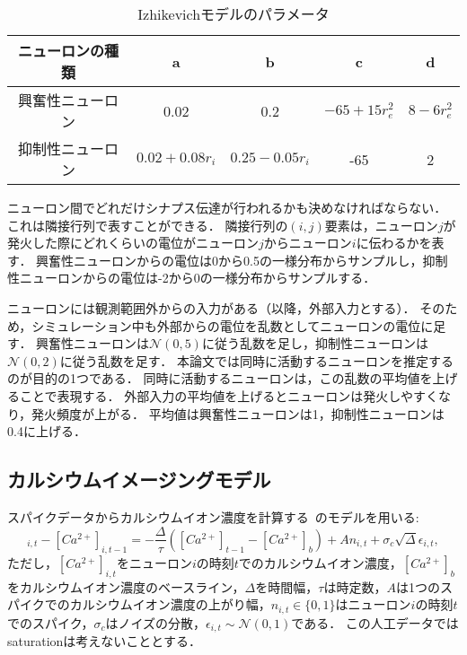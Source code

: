 \begin{table}[htb]
  \center
  \begin{tabular}{|c|cccc|} \hline
    ニューロンの種類 & a & b & c & d \\ \hline
    興奮性ニューロン & 0.02 & 0.2 & $-65 + 15 r_e^2$ & $8 - 6r_e^2$ \\
    抑制性ニューロン & $0.02 + 0.08r_i$ & $0.25 - 0.05 r_i$ & -65 & 2 \\ \hline
  \end{tabular}
  \caption{Izhikevichモデルのパラメータ}
  \label{tab:parameter1}
\end{table}

ニューロン間でどれだけシナプス伝達が行われるかも決めなければならない．
これは隣接行列で表すことができる．
隣接行列の$(i,j)$要素は，ニューロン$j$が発火した際にどれくらいの電位がニューロン$j$からニューロン$i$に伝わるかを表す．
興奮性ニューロンからの電位は0から0.5の一様分布からサンプルし，抑制性ニューロンからの電位は-2から0の一様分布からサンプルする．

ニューロンには観測範囲外からの入力がある（以降，外部入力とする）．
そのため，シミュレーション中も外部からの電位を乱数としてニューロンの電位に足す．
興奮性ニューロンは$\mathcal{N}(0,5)$に従う乱数を足し，抑制性ニューロンは$\mathcal{N}(0,2)$に従う乱数を足す．
本論文では同時に活動するニューロンを推定するのが目的の1つである．
同時に活動するニューロンは，この乱数の平均値を上げることで表現する．
外部入力の平均値を上げるとニューロンは発火しやすくなり，発火頻度が上がる．
平均値は興奮性ニューロンは1，抑制性ニューロンは0.4に上げる．

\subsection{カルシウムイメージングモデル}
スパイクデータからカルシウムイオン濃度を計算する~\cite{Vogelstein2009}のモデルを用いる:
\begin{equation}
  [Ca^{2+}]_{i,t} - [Ca^{2+}]_{i,t-1} = - \frac{\Delta}{\tau}([Ca^{2+}]_{t-1} - [Ca^{2+}]_b) + An_{i,t} + \sigma_c \sqrt{\Delta} \epsilon_{i,t},
  \label{eq:calcium}
\end{equation}
ただし，$[Ca^{2+}]_{i,t}$をニューロン$i$の時刻$t$でのカルシウムイオン濃度，$[Ca^{2+}]_b$をカルシウムイオン濃度のベースライン，$\Delta$を時間幅，$\tau$は時定数，$A$は1つのスパイクでのカルシウムイオン濃度の上がり幅，$n_{i,t} \in \{0,1\}$はニューロン$i$の時刻$t$でのスパイク，$\sigma_c$はノイズの分散，$\epsilon_{i,t} \sim \mathcal{N}(0,1)$である．
この人工データではsaturationは考えないこととする．

